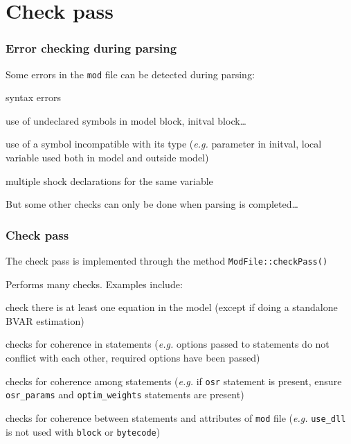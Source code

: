 \documentclass[aspectratio=169]{beamer}
\newenvironment{witemize}{\itemize\addtolength{\itemsep}{8pt}}{\enditemize}
\begin{document}
\section{Check pass}

\begin{frame}
  \frametitle{Error checking during parsing}
  \begin{witemize}
  \item Some errors in the \texttt{mod} file can be detected during parsing:
    \begin{witemize}
    \item syntax errors
    \item use of undeclared symbols in model block, initval block\ldots
    \item use of a symbol incompatible with its type (\textit{e.g.} parameter in initval, local variable used both in model and outside model)
    \item multiple shock declarations for the same variable
    \end{witemize}
  \item But some other checks can only be done when parsing is completed\ldots
  \end{witemize}
\end{frame}

\begin{frame}
  \frametitle{Check pass}
  \begin{witemize}
  \item The check pass is implemented through the method \texttt{ModFile::checkPass()}
  \item Performs many checks. Examples include:
    \begin{witemize}
    \item check there is at least one equation in the model (except if doing a standalone BVAR estimation)
    \item checks for coherence in statements (\textit{e.g.} options passed to statements do not conflict with each other, required options have been passed)
    \item checks for coherence among statements (\textit{e.g.} if \texttt{osr} statement is present, ensure \texttt{osr\_params} and \texttt{optim\_weights} statements are present)
    \item checks for coherence between statements and attributes of \texttt{mod} file (\textit{e.g.} \texttt{use\_dll} is not used with \texttt{block} or \texttt{bytecode})
    \end{witemize}
  \end{witemize}
\end{frame}
\end{document}
